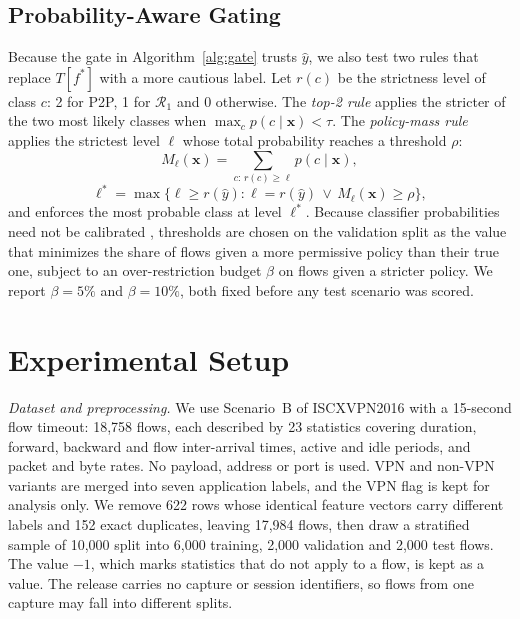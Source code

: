 \documentclass[conference]{IEEEtran}
\begin{document}
\subsection{Probability-Aware Gating}
Because the gate in Algorithm~\ref{alg:gate} trusts $\hat{y}$, we also test two rules that replace $T[f^{\ast}]$ with a more cautious label. Let $r(c)$ be the strictness level of class $c$: 2 for P2P, 1 for $\mathcal{R}_1$ and 0 otherwise. The \emph{top-2 rule} applies the stricter of the two most likely classes when $\max_c p(c \mid \mathbf{x}) < \tau$. The \emph{policy-mass rule} applies the strictest level $\ell$ whose total probability reaches a threshold $\rho$:
\begin{equation}
M_\ell(\mathbf{x}) = \sum_{c:\, r(c) \ge \ell} p(c \mid \mathbf{x}),
\end{equation}
\begin{equation}
\ell^{\ast} = \max\big\{\ell \ge r(\hat{y}) : \ell = r(\hat{y}) \,\vee\, M_\ell(\mathbf{x}) \ge \rho\big\},
\label{eq:mass}
\end{equation}
and enforces the most probable class at level $\ell^{\ast}$. Because classifier probabilities need not be calibrated \cite{guo2017calibration}, thresholds are chosen on the validation split as the value that minimizes the share of flows given a more permissive policy than their true one, subject to an over-restriction budget $\beta$ on flows given a stricter policy. We report $\beta = 5\%$ and $\beta = 10\%$, both fixed before any test scenario was scored.

\section{Experimental Setup}

\textit{Dataset and preprocessing.} We use Scenario~B of ISCXVPN2016 with a 15-second flow timeout: 18,758 flows, each described by 23 statistics covering duration, forward, backward and flow inter-arrival times, active and idle periods, and packet and byte rates. No payload, address or port is used. VPN and non-VPN variants are merged into seven application labels, and the VPN flag is kept for analysis only. We remove 622 rows whose identical feature vectors carry different labels and 152 exact duplicates, leaving 17,984 flows, then draw a stratified sample of 10,000 split into 6,000 training, 2,000 validation and 2,000 test flows. The value $-1$, which marks statistics that do not apply to a flow, is kept as a value. The release carries no capture or session identifiers, so flows from one capture may fall into different splits.
\end{document}
